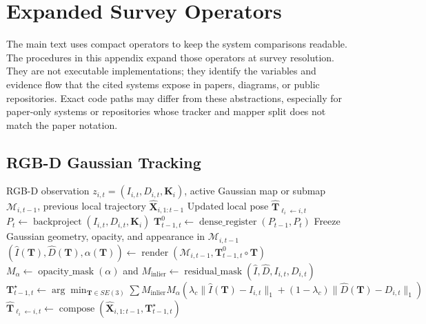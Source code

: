 \documentclass[11pt, a4paper, logo]{googledeepmind}
\begin{document}


\appendix

\section{Expanded Survey Operators}
\label{app:expanded-survey-operators}

The main text uses compact operators to keep the system comparisons readable. The procedures in this appendix expand those operators at survey resolution. They are not executable implementations; they identify the variables and evidence flow that the cited systems expose in papers, diagrams, or public repositories. Exact code paths may differ from these abstractions, especially for paper-only systems or repositories whose tracker and mapper split does not match the paper notation.

\subsection{RGB-D Gaussian Tracking}

\begin{algorithm}[H]
\caption{RGB-D Gaussian tracking family}
\label{alg:app-magic-rgbd-tracking}
\small
\begin{algorithmic}[1]
  \Require RGB-D observation $z_{i,t}=(I_{i,t},D_{i,t},\mathbf{K}_i)$, active Gaussian map or submap $\mathcal{M}_{i,t-1}$, previous local trajectory $\hat{\mathbf{X}}_{i,1:t-1}$
  \Ensure Updated local pose $\hat{\mathbf{T}}_{\ell_i\leftarrow i,t}$
  \State $P_t \gets \operatorname{backproject}(I_{i,t},D_{i,t},\mathbf{K}_i)$ 
  \State $\mathbf{T}^{0}_{t-1,t} \gets \operatorname{dense\_register}(P_{t-1},P_t)$ 
  \State Freeze Gaussian geometry, opacity, and appearance in $\mathcal{M}_{i,t-1}$
  \State $(\hat I(\mathbf{T}),\hat D(\mathbf{T}),\alpha(\mathbf{T})) \gets \operatorname{render}(\mathcal{M}_{i,t-1},\mathbf{T}^{0}_{t-1,t}\circ\mathbf{T})$
  \State $M_\alpha \gets \operatorname{opacity\_mask}(\alpha)$ and $M_{\mathrm{inlier}}\gets\operatorname{residual\_mask}(\hat I,\hat D,I_{i,t},D_{i,t})$
  \State $\mathbf{T}_{t-1,t}^{\star}\gets \arg\min_{\mathbf{T}\in SE(3)} \sum M_{\mathrm{inlier}}M_\alpha\left(\lambda_c\lVert\hat I(\mathbf{T})-I_{i,t}\rVert_1+(1-\lambda_c)\lVert\hat D(\mathbf{T})-D_{i,t}\rVert_1\right)$
  \State \Return $\hat{\mathbf{T}}_{\ell_i\leftarrow i,t}\gets\operatorname{compose}(\hat{\mathbf{X}}_{i,1:t-1},\mathbf{T}_{t-1,t}^{\star})$
\end{algorithmic}
\end{algorithm}
\end{document}
